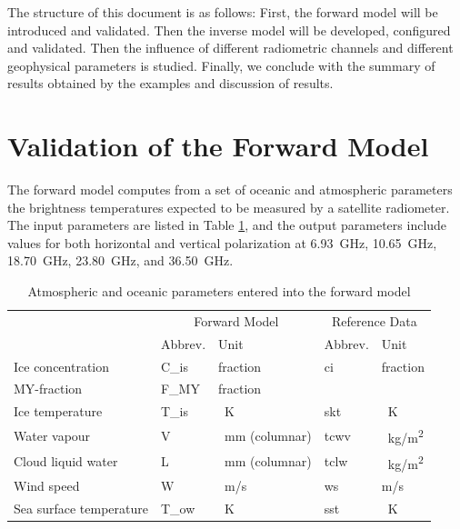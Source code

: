 \documentclass[11pt, a4paper]{article}
\begin{document}
The structure of this document is as follows: First, the forward model will be introduced and validated. Then the inverse model will be developed, configured and validated. Then the influence of different radiometric channels and different geophysical parameters is studied. Finally, we conclude with the summary of results obtained by the examples and discussion of results.
















\newpage
\section{Validation of the Forward Model}

The forward model computes from a set of oceanic and atmospheric parameters the brightness temperatures expected to be measured by a satellite radiometer. The input parameters are listed in Table \ref{tab:input_parameters}, and the output parameters include values for both horizontal and vertical polarization at \SI{6.93}{GHz}, \SI{10.65}{GHz}, \SI{18.70}{GHz}, \SI{23.80}{GHz}, and \SI{36.50}{GHz}.

\begin{table}[h!]
\centering
\begin{tabular}{@{}p{4cm} p{1.8cm}p{2.8cm}p{1.8cm}p{1.8cm}@{}}
\tabularnewline
& \multicolumn{2}{c}{Forward Model} & \multicolumn{2}{c}{Reference Data}
\tabularnewline
\cmidrule(r{1em}){2-3} \cmidrule(l{1em}){4-5}
& Abbrev. & Unit & Abbrev. & Unit
\tabularnewline
\midrule
Ice concentration	& C\_is	& fraction		& ci	& fraction	\\
MY-fraction		& F\_MY	& fraction		& 	& 		\\
Ice temperature		& T\_is	& \SI{}{K}	& skt	& \SI{}{K}	\\
Water vapour		& V	& \SI{}{mm} (columnar)	& tcwv	& \SI{}{kg/m^2}	\\
Cloud liquid water	& L	& \SI{}{mm} (columnar)	& tclw	& \SI{}{kg/m^2}	\\
Wind speed		& W	& \SI{}{m/s}		& ws	& m/s		\\
Sea surface temperature	& T\_ow	& \SI{}{K}	& sst	& \SI{}{K}	\\
\midrule
\end{tabular}
\caption{Atmospheric and oceanic parameters entered into the forward model}
\label{tab:input_parameters}
\end{table}
\end{document}
